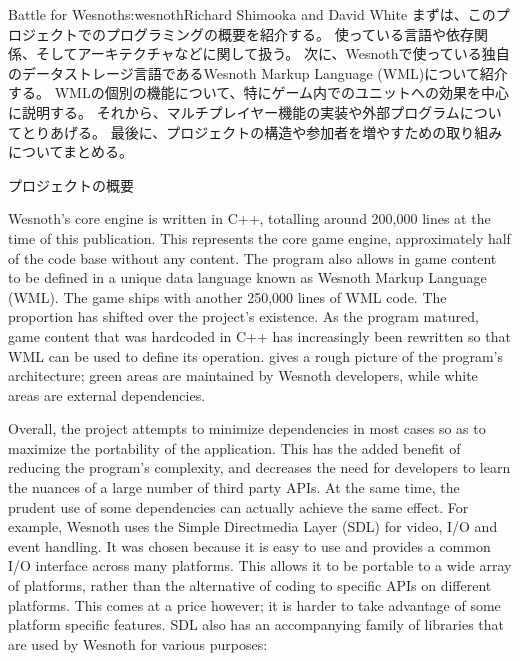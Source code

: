 \begin{aosachapter}{Battle for Wesnoth}{s:wesnoth}{Richard Shimooka and David White}
まずは、このプロジェクトでのプログラミングの概要を紹介する。
使っている言語や依存関係、そしてアーキテクチャなどに関して扱う。
次に、Wesnothで使っている独自のデータストレージ言語であるWesnoth Markup Language (WML)について紹介する。
WMLの個別の機能について、特にゲーム内でのユニットへの効果を中心に説明する。
それから、マルチプレイヤー機能の実装や外部プログラムについてとりあげる。
最後に、プロジェクトの構造や参加者を増やすための取り組みについてまとめる。

\begin{aosasect1}{プロジェクトの概要}

Wesnoth's core engine is written in C++, totalling around 200,000 lines
at the time of this publication. This represents the core game engine,
approximately half of the code base without any content.  The program
also allows in game content to be defined in a unique data language
known as Wesnoth Markup Language (WML). The game ships with another
250,000 lines of WML code. The proportion has shifted over the
project's existence. As the program matured, game content that was
hardcoded in C++ has increasingly been rewritten so that WML can
be used to define its operation.  gives a
rough picture of the program's architecture; green areas are
maintained by Wesnoth developers, while white areas are external
dependencies.


Overall, the project attempts to minimize dependencies in most cases
so as to maximize the portability of the application. This has the
added benefit of reducing the program's complexity, and decreases the
need for developers to learn the nuances of a large number of third
party APIs.  At the same time, the prudent use of some dependencies
can actually achieve the same effect. For example, Wesnoth uses the
Simple Directmedia Layer (SDL) for video, I/O and event handling. It
was chosen because it is easy to use and provides a common I/O
interface across many platforms.  This allows it to be portable to a
wide array of platforms, rather than the alternative of coding to
specific APIs on different platforms. This comes at a price however;
it is harder to take advantage of some platform specific features. SDL
also has an accompanying family of libraries that are used by Wesnoth
for various purposes:


\end{aosasect1}
\end{aosachapter}
